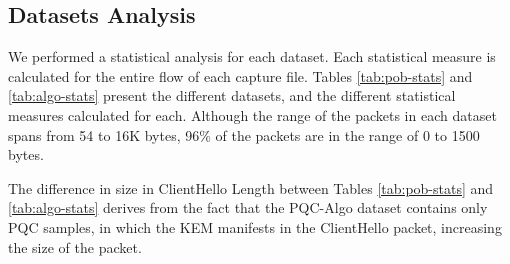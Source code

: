 \documentclass[10pt,journal]{IEEEtran}%
\begin{document}
\subsection{Datasets Analysis}
We performed a statistical analysis for each dataset. Each statistical measure is calculated for the entire flow of each capture file. Tables \ref{tab:pob-stats} and \ref{tab:algo-stats} present the different datasets, and the different statistical measures calculated for each.
Although the range of the packets in each dataset spans from 54 to 16K bytes, 96\% of the packets are in the range of 0 to 1500 bytes.

The difference in size in ClientHello Length between Tables \ref{tab:pob-stats} and \ref{tab:algo-stats} derives from the fact that the PQC-Algo dataset contains only PQC samples, in which the KEM manifests in the ClientHello packet, increasing the size of the packet.
\end{document}
